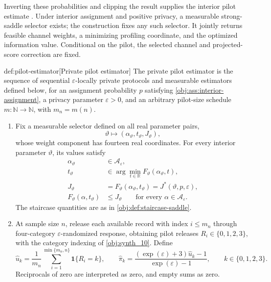 Inverting these probabilities and clipping the result supplies the interior pilot estimate . Under interior assignment and positive privacy, a measurable strong-saddle selector exists; the construction fixes any such selector. It jointly returns feasible channel weights, a minimizing profiling coordinate, and the optimized information value. Conditional on the pilot, the selected channel and projected-score correction are fixed.

\begin{algorithmv}{def:pilot-estimator}[Private pilot estimator]
The private pilot estimator is the sequence of sequential \(\varepsilon\)-locally private protocols and measurable estimators defined below, for an assignment probability \(p\) satisfying \cref{obj:ass:interior-assignment}, a privacy parameter \(\varepsilon>0\), and an arbitrary pilot-size schedule \(m:\mathbb N\to\mathbb N\), with \(m_n=m(n)\).
\begin{enumerate}
\item Fix a measurable selector defined on all real parameter pairs,
\[
\vartheta\longmapsto
(\alpha_{\vartheta},t_{\vartheta},J_{\vartheta}),
\]
whose weight component has fourteen real coordinates. For every interior parameter \(\vartheta\), its values satisfy
\[
\begin{aligned}
\alpha_{\vartheta}&\in\mathcal A_\varepsilon,\\
t_{\vartheta}&\in\arg\min_{t\in\mathbb R}
F_{\vartheta}(\alpha_{\vartheta},t),\\
J_{\vartheta}
&=F_{\vartheta}(\alpha_{\vartheta},t_{\vartheta})
=J^*(\vartheta,p,\varepsilon),\\
F_{\vartheta}(\alpha,t_{\vartheta})
&\le J_{\vartheta}
\qquad\text{for every }\alpha\in\mathcal A_\varepsilon.
\end{aligned}
\]
The staircase quantities are as in \cref{obj:def:staircase-saddle}.

\item At sample size \(n\), release each available record with index \(i\le m_n\) through four-category \(\varepsilon\)-randomized response, obtaining pilot releases \(R_i\in\{0,1,2,3\}\), with the category indexing of \cref{obj:synth_10}. Define
\[
\widehat u_k
=\frac{1}{m_n}
\sum_{i=1}^{\min\{m_n,n\}}\mathbf 1\{R_i=k\},
\qquad
\widehat\pi_k
=\frac{(\exp(\varepsilon)+3)\widehat u_k-1}
{\exp(\varepsilon)-1},
\qquad k\in\{0,1,2,3\}.
\]
Reciprocals of zero are interpreted as zero, and empty sums as zero.


\end{enumerate}
\end{algorithmv}

